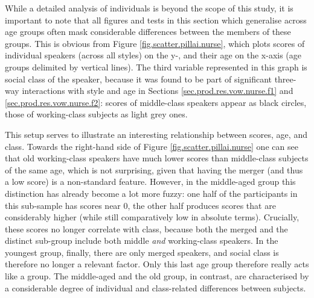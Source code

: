 While a detailed analysis of individuals is beyond the scope of this study, it is important to note that all figures and tests in this section which generalise across age groups often mask considerable differences between the members of these groups.
This is obvious from Figure \ref{fig.scatter.pillai.nurse}, which plots  scores of individual speakers (across all styles) on the y-, and their age on the x-axis (age groups delimited by vertical lines).
The third variable represented in this graph is social class of the speaker, because it was found to be part of significant three-way interactions with style and age in Sections \ref{sec.prod.res.vow.nurse.f1} and \ref{sec.prod.res.vow.nurse.f2}:  scores of middle-class speakers appear as black circles, those of working-class subjects as light grey ones.

This setup serves to illustrate an interesting relationship between  scores, age, and class.
Towards the right-hand side of Figure \ref{fig.scatter.pillai.nurse} one can see that old working-class speakers have much lower  scores than middle-class subjects of the same age, which is not surprising, given that having the merger (and thus a low  score) is a non-standard feature.
However, in the middle-aged group this distinction has already become a lot more fuzzy: one half of the participants in this sub-sample has  scores near 0, the other half produces scores that are considerably higher (while still comparatively low in absolute terms).
Crucially, these scores no longer correlate with class, because both the merged and the distinct sub-group include both middle \emph{and} working-class speakers.
In the youngest group, finally, there are only merged speakers, and social class is therefore no longer a relevant factor.
Only this last age group therefore really acts like a group.
The middle-aged and the old group, in contrast, are characterised by a considerable degree of individual and class-related differences between subjects.